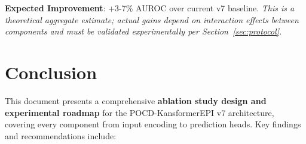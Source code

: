 \documentclass[11pt,a4paper]{article}
\begin{document}
\textbf{Expected Improvement}: +3-7\% AUROC over current v7 baseline. \textit{This is a theoretical aggregate estimate; actual gains depend on interaction effects between components and must be validated experimentally per Section~\ref{sec:protocol}.}

\section{Conclusion}

This document presents a comprehensive \textbf{ablation study design and experimental roadmap} for the POCD-KansformerEPI v7 architecture, covering every component from input encoding to prediction heads. Key findings and recommendations include:
\end{document}
